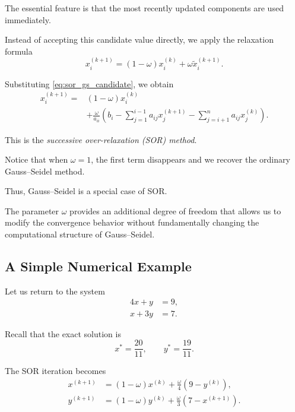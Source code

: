 \documentclass[11pt,a4paper]{article}
\theoremstyle{definition}
\theoremstyle{remark}
\begin{document}
The essential feature is that the
most recently updated components
are used immediately.

Instead of accepting this candidate
value directly, we apply the
relaxation formula
\[
    x_i^{(k+1)}
    =
    (1-\omega)x_i^{(k)}
    +
    \omega\widetilde{x}_i^{(k+1)}.
\]

Substituting
\eqref{eq:sor_gs_candidate},
we obtain
\begin{equation}
\boxed{
\begin{aligned}
x_i^{(k+1)}
={}&
(1-\omega)x_i^{(k)}
\\
&+
\frac{\omega}{a_{ii}}
\left(
b_i
-
\sum_{j=1}^{i-1}
a_{ij}x_j^{(k+1)}
-
\sum_{j=i+1}^{n}
a_{ij}x_j^{(k)}
\right).
\end{aligned}
}
\label{eq:sor_component}
\end{equation}

This is the \emph{successive over-relaxation
(SOR) method}.

Notice that when $\omega=1$,
the first term disappears and
we recover the ordinary
Gauss--Seidel method.

Thus, Gauss--Seidel is a special
case of SOR.

The parameter $\omega$ provides
an additional degree of freedom
that allows us to modify the
convergence behavior without
fundamentally changing the
computational structure of
Gauss--Seidel.


\subsection{A Simple Numerical Example}

Let us return to the system
\[
\begin{aligned}
    4x+y&=9,\\
    x+3y&=7.
\end{aligned}
\]

Recall that the exact solution is
\[
    x^*=\frac{20}{11},
    \qquad
    y^*=\frac{19}{11}.
\]

The SOR iteration becomes
\begin{equation}
\begin{aligned}
x^{(k+1)}
&=
(1-\omega)x^{(k)}
+
\frac{\omega}{4}
\left(9-y^{(k)}\right),
\\[4pt]
y^{(k+1)}
&=
(1-\omega)y^{(k)}
+
\frac{\omega}{3}
\left(7-x^{(k+1)}\right).
\end{aligned}
\label{eq:sor_simple_example}
\end{equation}
\end{document}
